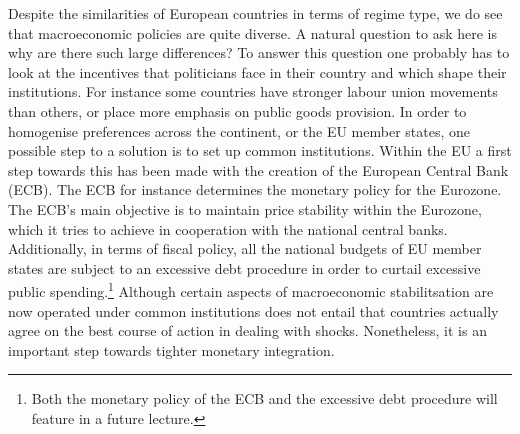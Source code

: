 \documentclass{tufte-handout}
\begin{document}
\clearpage
Despite the similarities of European countries in terms of regime type, we do see that macroeconomic policies are quite diverse. 
A natural question to ask here is why are there such large differences? 
To answer this question one probably has to look at the incentives that politicians face in their country and which shape their institutions. 
For instance some countries have stronger labour union movements than others, or place more emphasis on public goods provision. 
In order to homogenise preferences across the continent, or the EU member states, one possible step to a solution is to set up common institutions. 
Within the EU a first step towards this has been made with the creation of the European Central Bank (ECB).
The ECB for instance determines the monetary policy for the Eurozone.
The ECB's main objective is to maintain price stability within the Eurozone, which it tries to achieve in cooperation with the national central banks. 
Additionally, in terms of fiscal policy, all the national budgets of EU member states are subject to an excessive debt procedure in order to curtail excessive public spending.\footnote{Both the monetary policy of the ECB and the excessive debt procedure will feature in a future lecture.}
Although certain aspects of macroeconomic stabilitsation are now operated under common institutions does not entail that countries actually agree on the best course of action in dealing with shocks. 
Nonetheless, it is an important step towards tighter monetary integration.

\end{document}
